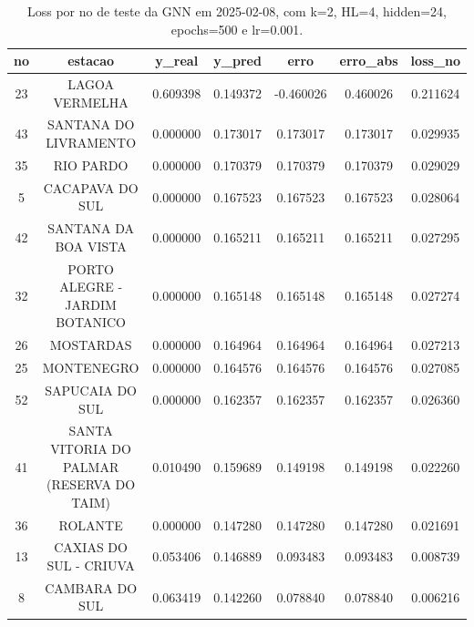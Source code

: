 \begin{table}[h]
\centering
\caption{Loss por no de teste da GNN em 2025-02-08, com k=2, HL=4, hidden=24, epochs=500 e lr=0.001.}
\label{tab:gnn_loss_k2_hl4_h24_e500_d20250208}
\begin{tabular}{ccccccc}
\toprule
no & estacao & y\_real & y\_pred & erro & erro\_abs & loss\_no \\
\midrule
23 & LAGOA VERMELHA & 0.609398 & 0.149372 & -0.460026 & 0.460026 & 0.211624 \\
43 & SANTANA DO LIVRAMENTO & 0.000000 & 0.173017 & 0.173017 & 0.173017 & 0.029935 \\
35 & RIO PARDO & 0.000000 & 0.170379 & 0.170379 & 0.170379 & 0.029029 \\
5 & CACAPAVA DO SUL & 0.000000 & 0.167523 & 0.167523 & 0.167523 & 0.028064 \\
42 & SANTANA DA BOA VISTA & 0.000000 & 0.165211 & 0.165211 & 0.165211 & 0.027295 \\
32 & PORTO ALEGRE - JARDIM BOTANICO & 0.000000 & 0.165148 & 0.165148 & 0.165148 & 0.027274 \\
26 & MOSTARDAS & 0.000000 & 0.164964 & 0.164964 & 0.164964 & 0.027213 \\
25 & MONTENEGRO & 0.000000 & 0.164576 & 0.164576 & 0.164576 & 0.027085 \\
52 & SAPUCAIA DO SUL & 0.000000 & 0.162357 & 0.162357 & 0.162357 & 0.026360 \\
41 & SANTA VITORIA DO PALMAR (RESERVA DO TAIM) & 0.010490 & 0.159689 & 0.149198 & 0.149198 & 0.022260 \\
36 & ROLANTE & 0.000000 & 0.147280 & 0.147280 & 0.147280 & 0.021691 \\
13 & CAXIAS DO SUL - CRIUVA & 0.053406 & 0.146889 & 0.093483 & 0.093483 & 0.008739 \\
8 & CAMBARA DO SUL & 0.063419 & 0.142260 & 0.078840 & 0.078840 & 0.006216 \\
\bottomrule
\end{tabular}
\end{table}
